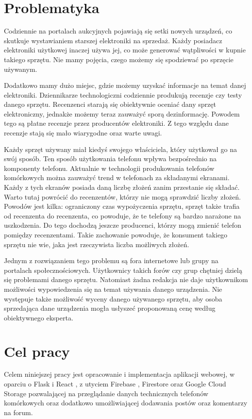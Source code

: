 \section{Problematyka}
Codziennie na portalach aukcyjnych pojawiają się setki nowych urządzeń, co skutkuje wystawianiem starszej elektroniki na sprzedaż. Każdy posiadacz elektroniki użytkowej inaczej używa jej, co może generować wątpliwości w kupnie takiego sprzętu. Nie mamy pojęcia, czego możemy się spodziewać po sprzęcie używanym.

Dodatkowo mamy dużo miejsc, gdzie możemy uzyskać informacje na temat danej elektroniki. Dziennikarze technologiczni codziennie produkują recenzje czy testy danego sprzętu. Recenzenci starają się obiektywnie oceniać dany sprzęt elektroniczny, jednakże możemy teraz zauważyć sporą dezinformację. Powodem tego są płatne recenzje przez producentów elektroniki. Z tego względu dane recenzje stają się mało wiarygodne oraz warte uwagi.

Każdy sprzęt używany miał kiedyś swojego właściciela, który użytkował go na swój sposób. Ten sposób użytkowania telefonu wpływa bezpośrednio na komponenty telefonu. Aktualnie w technologii produkowania telefonów komórkowych można zauważyć trend w telefonach za składanymi ekranami. Każdy z tych ekranów posiada daną liczbę złożeń zanim przestanie się składać. Warto tutaj powrócić do recenzentów, którzy nie mogą  sprawdzić liczby złożeń. Powodów jest kilka: ograniczony czas wypożyczenia sprzętu, sprzęt także trafia od recenzenta do recenzenta, co powoduje, że te telefony są bardzo narażone na uszkodzenia. Do tego dochodzą jeszcze producenci, którzy mogą zmienić telefon pomiędzy recenzentami. Takie zachowanie powoduje, że konsument takiego sprzętu nie wie, jaka jest rzeczywista liczba możliwych złożeń.

Jednym z rozwiązaniem tego problemu są fora internetowe lub grupy na portalach społecznościowych. Użytkownicy takich forów czy grup chętniej dzielą się problemami danego sprzętu. Natomiast żadna redakcja nie daje użytkownikom możliwości wypowiedzenia się na temat używania danego urządzenia. Nie występuje także możliwość wyceny danego używanego sprzętu, aby osoba sprzedająca dane urządzenia mogła usłyszeć proponowaną cenę według obiektywnego eksperta.

\section{Cel pracy}
Celem niniejszej pracy jest opracowanie i implementacja aplikacji webowej, w oparciu o Flask \cite{flask} i React \cite{React}, z utyciem Firebase \cite*{firebase}, Firestore \cite*{firestore} oraz Google Cloud Storage \cite*{cloud_storage} pozwalającej na przeglądanie danych technicznych telefonów komórkowych oraz dodatkowo umożliwiającej dodawania postów oraz komentarzy na forum.

